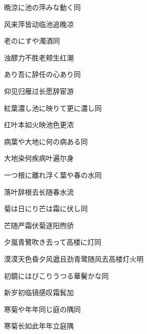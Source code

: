 \begin{haiku}
    {\FH 晩涼に池の萍みな動く}\hfill{\FH 同}

    {\FK 风来萍皆动临池追晚凉}
\end{haiku}

\begin{haiku}
    {\FH 老のにすや濁酒}\hfill{\FH 同}

    {\FK 浊醪力不胜老颊生红潮}
\end{haiku}

\begin{haiku}
    {\FH {}あり吾に辞任の心あり}\hfill{\FH 同}

    {\FK 仰见归雁过长愿辞宦游}
\end{haiku}

\begin{haiku}
    {\FH 紅葉濃し池に映りて更に濃し}\hfill{\FH 同}

    {\FK 红叶本如火映池色更浓}
\end{haiku}

\begin{haiku}
    {\FH 病葉や大地に何の病ある}\hfill{\FH 同}

    {\FK 大地染何疾病叶遍尔身}
\end{haiku}

\begin{haiku}
    {\FH 一つ根に離れ浮く葉や春の水}\hfill{\FH 同}

    {\FK 落叶辞根去长随春水流}
\end{haiku}

\begin{haiku}
    {\FH 菊は日にり芒は霜に伏し}\hfill{\FH 同}

    {\FK 芒随严霜伏菊逐阳煦骄}
\end{haiku}

\begin{haiku}
    {\FH 夕嵐青鷺吹き去って高楼に灯}\hfill{\FH 同}

    {\FK 漠漠天色昏夕风遒且劲青鹭随风去高楼灯火明}
\end{haiku}

\begin{haiku}
    {\FH 初鏡にはびこりうつる華鬢かな}\hfill{\FH 同}

    {\FK 新岁初临镜感叹霜鬂加}
\end{haiku}

\begin{haiku}
    {\FH 寒菊や年年同じ庭の隅}\hfill{\FH 同}

    {\FK 寒菊长如此年年立庭隅}
\end{haiku}

